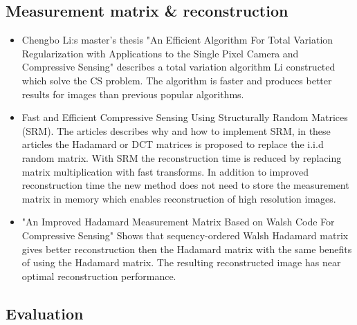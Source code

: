 \subsection{Measurement matrix \& reconstruction}

\begin{itemize}
    
\item \cite{article:TVAL3} Chengbo Li:s master's thesis "An Efficient Algorithm For Total Variation Regularization with Applications to the Single Pixel Camera and Compressive Sensing" describes a total variation algorithm Li constructed which solve the CS problem. The algorithm is faster and produces better results for images than previous popular algorithms.   

\item \cite{article:SRM_short, article:SRM_long, article:SRM_block} Fast and Efficient Compressive Sensing Using Structurally Random Matrices (SRM). The articles describes why and how to implement SRM, in these articles the Hadamard or DCT matrices is proposed to replace the i.i.d random matrix. With SRM the reconstruction time is reduced by replacing matrix multiplication with fast transforms. In addition to improved reconstruction time the new method does not need to store the measurement matrix in memory which enables reconstruction of high resolution images. 

\item \cite{article:an_improved_WH_matrix} "An Improved Hadamard Measurement Matrix Based on Walsh Code For Compressive Sensing" Shows that sequency-ordered Walsh Hadamard matrix gives better reconstruction then the Hadamard matrix with the same benefits of using the Hadamard matrix. The resulting reconstructed image has near optimal reconstruction performance.
	

\end{itemize}


\subsection{Evaluation}

